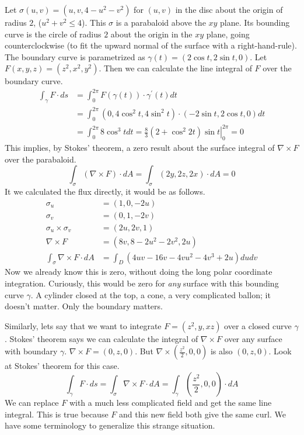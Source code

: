\documentclass[fleqn,letterpaper]{report}
\begin{document}
\begin{example}
Let $\sigma(u,v) = (u,v,4-u^2-v^2)$ for $(u,v)$ in the disc
about the origin of radius $2$, ($u^2 + v^2 \leq 4$). This
$\sigma$ is a parabaloid above the $xy$ plane. Its bounding
curve is the circle of radius $2$ about the origin in the $xy$
plane, going counterclockwise (to fit the upward normal of the
surface with a right-hand-rule). The boundary curve is
parametrized as $\gamma(t) = (2 \cos t, 2 \sin t, 0)$. Let
$F(x,y,z) = (z^2, x^2, y^2)$. Then we can calculate the line
integral of $F$ over the boundary curve.
\begin{align*}
\int_{\gamma} F \cdot ds & = \int_0^{2\pi} F(\gamma(t)) \cdot
\gamma^\prime(t) dt \\
& = \int_0^{2\pi} (0, 4\cos^2 t, 4 \sin^2 t) \cdot (-2\sin t,
2\cos t, 0) dt \\
& = \int_0^{2\pi} 8 \cos^3 t dt = \left. \frac{8}{3} (2 +
\cos^2 2t) \sin t \right|_0^{2\pi} = 0 
\end{align*}
This implies, by Stokes' theorem, a zero result about the
surface integral of $\nabla \times F$ over the parabaloid.
\begin{equation*}
\int_{\sigma} (\nabla \times F) \cdot dA = \int_{\sigma} (2y,
2z, 2x) \cdot dA = 0
\end{equation*}
It we calculated the flux directly, it would be as follows.
\begin{align*}
\sigma_u & = (1,0, -2u) \\
\sigma_v & = (0,1, -2v) \\
\sigma_u \times \sigma_v & = (2u, 2v, 1) \\
\nabla \times F & = (8v, 8-2u^2-2v^2, 2u) \\
\int_{\sigma} \nabla \times F \cdot dA & = \int_D (4uv - 16 v
- 4vu^2 - 4v^3 + 2u) du dv
\end{align*}
Now we already know this is zero, without doing the long polar
coordinate integration. Curiously, this would be zero for
\emph{any} surface with this bounding curve $\gamma$. A
cylinder closed at the top, a cone, a very complicated ballon;
it doesn't matter. Only the boundary matters. 
\end{example}

\begin{example}
Similarly, lets say that we want to integrate $F = (z^2, y,
xz)$ over a closed curve $\gamma$. Stokes' theorem says we
can calculate the integral of $\nabla \times F$ over any
surface with boundary $\gamma$. $\nabla \times F = (0,z,0)$.
But $\nabla \times (\frac{z^2}{2}, 0,0)$ is also $(0,z,0)$.
Look at Stokes' theorem for this case.
\begin{equation*}
\int_{\gamma} F \cdot ds = \int_{\sigma} \nabla \times F \cdot
dA = \int_{\gamma} (\frac{z^2}{2}, 0, 0) \cdot dA
\end{equation*}
We can replace $F$ with a much less complicated field and get the same
line integral. This is true because $F$ and this new field
both give the same curl. We have some terminology to
generalize this strange situation.
\end{example}
\end{document}
